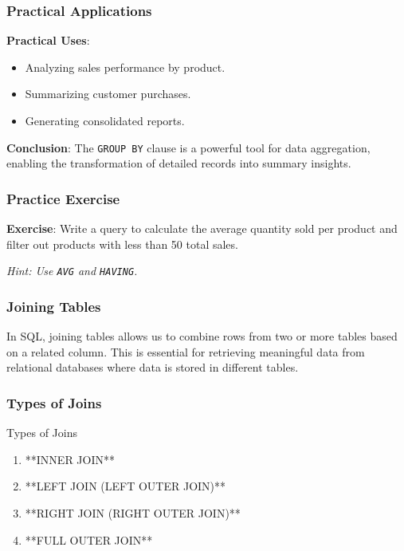 \documentclass[aspectratio=169]{beamer}
\begin{document}
\begin{frame}
    \frametitle{Practical Applications}
    \textbf{Practical Uses}:
    \begin{itemize}
        \item Analyzing sales performance by product.
        \item Summarizing customer purchases.
        \item Generating consolidated reports.
    \end{itemize}
    
    \textbf{Conclusion}:
    The \texttt{GROUP BY} clause is a powerful tool for data aggregation, enabling the transformation of detailed records into summary insights.
\end{frame}

\begin{frame}[fragile]
    \frametitle{Practice Exercise}
    \textbf{Exercise}: 
    Write a query to calculate the average quantity sold per product 
    and filter out products with less than 50 total sales.
    
    \textit{Hint: Use \texttt{AVG} and \texttt{HAVING}.}
\end{frame}

\begin{frame}
    \frametitle{Joining Tables}
    In SQL, joining tables allows us to combine rows from two or more tables based on a related column. 
    This is essential for retrieving meaningful data from relational databases where data is stored in different tables.
\end{frame}

\begin{frame}
    \frametitle{Types of Joins}
    \begin{block}{Types of Joins}
        \begin{enumerate}
            \item **INNER JOIN**
            \item **LEFT JOIN (LEFT OUTER JOIN)**
            \item **RIGHT JOIN (RIGHT OUTER JOIN)**
            \item **FULL OUTER JOIN**
        \end{enumerate}
    \end{block}
\end{frame}
\end{document}
